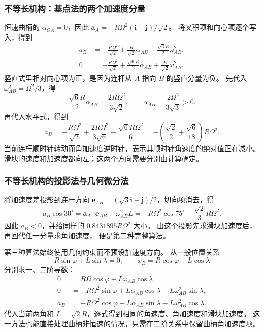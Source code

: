 \documentclass[UTF8,zihao=-4,fontset=fandol,a4paper]{ctexart}
\newcommand{\vect}[1]{\bm{#1}}
\begin{document}
\subsubsection*{不等长机构：基点法的两个加速度分量}
恒速曲柄的 $\alpha_{OA}=0$，因此
$\vect a_A=-R\Omega^2(\vect i+\vect j)/\sqrt2$。
将叉积项和向心项逐个写入，得到
\begin{align*}
a_B&=-\frac{R\Omega^2}{\sqrt2}
+\frac R{\sqrt2}\alpha_{AB}
-\frac{\sqrt6R}{2}\omega_{AB}^2,\\
0&=-\frac{R\Omega^2}{\sqrt2}
+\frac{\sqrt6R}{2}\alpha_{AB}
+\frac R{\sqrt2}\omega_{AB}^2.
\end{align*}
竖直式里相对向心项为正，是因为连杆从 $A$ 指向 $B$ 的竖直分量为负。
先代入 $\omega_{AB}^2=\Omega^2/3$，得
\[
\frac{\sqrt6R}{2}\alpha_{AB}
=\frac{2R\Omega^2}{3\sqrt2},
\qquad \alpha_{AB}=\frac{2\Omega^2}{3\sqrt3}>0.
\]
再代入水平式，得到
\[
a_B=-\frac{R\Omega^2}{\sqrt2}
+\frac{2R\Omega^2}{3\sqrt6}-\frac{\sqrt6R\Omega^2}{6}
=-\left(\frac{\sqrt2}{2}+\frac{\sqrt6}{18}\right)R\Omega^2.
\]
当前连杆顺时针转动而角加速度逆时针，表示其顺时针角速度的绝对值正在减小。
滑块的速度和加速度都向左；这两个方向需要分别由计算确定。

\subsubsection*{不等长机构的投影法与几何微分法}
将加速度差投影到连杆方向
$\vect e_{AB}=(\sqrt3\vect i-\vect j)/2$，切向项消去，得
\[
a_B\cos30^\circ
=\vect a_A\cdot\vect e_{AB}-\omega_{AB}^2L
=-R\Omega^2\cos75^\circ-\frac{\sqrt2}{3}R\Omega^2.
\]
因此 $a_B<0$，并给同样的 $0.8431895R\Omega^2$ 大小。
由这个投影先求滑块加速度后，再回代任一分量求角加速度，
便是第二种完整算法。

第三种算法始终使用几何约束而不预设加速度方向。
从一般位置关系
\[
R\sin\varphi+L\sin\lambda=0,
\qquad x_B=R\cos\varphi+L\cos\lambda
\]
分别求一、二阶导数：
\begin{align*}
0&=R\Omega\cos\varphi+L\omega_{AB}\cos\lambda,\\
0&=-R\Omega^2\sin\varphi
+L\alpha_{AB}\cos\lambda-L\omega_{AB}^2\sin\lambda,\\
a_B&=-R\Omega^2\cos\varphi
-L\alpha_{AB}\sin\lambda-L\omega_{AB}^2\cos\lambda.
\end{align*}
代入当前两角和 $L=\sqrt2R$，逐式得到相同的角速度、角加速度和滑块加速度。
这一方法也能直接处理曲柄非恒速的情况，只需在二阶关系中保留曲柄角加速度项。
\end{document}
